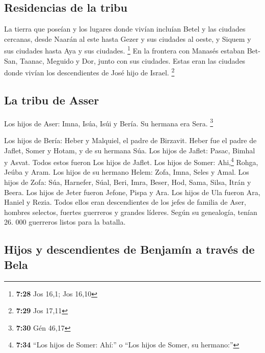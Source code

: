 \hypertarget{residencias-de-la-tribu}{%
\subsection{Residencias de la tribu}\label{residencias-de-la-tribu}}

 La tierra que poseían y los lugares donde vivían
incluían Betel y las ciudades cercanas, desde Naarán al este hasta Gezer
y sus ciudades al oeste, y Siquem y sus ciudades hasta Aya y sus
ciudades. \footnote{\textbf{7:28} Jos 16,1; Jos 16,10} 
En la frontera con Manasés estaban Bet-San, Taanac, Meguido y Dor, junto
con sus ciudades. Estas eran las ciudades donde vivían los descendientes
de José hijo de Israel. \footnote{\textbf{7:29} Jos 17,11}

\hypertarget{la-tribu-de-asser}{%
\subsection{La tribu de Asser}\label{la-tribu-de-asser}}

 Los hijos de Aser: Imna, Isúa, Isúi y Bería. Su hermana
era Sera. \footnote{\textbf{7:30} Gén 46,17}

 Los hijos de Bería: Heber y Malquiel, el padre de
Birzavit.  Heber fue el padre de Jaflet, Somer y Hotam, y
de su hermana Súa.  Los hijos de Jaflet: Pasac, Bimhal y
Asvat. Todos estos fueron Los hijos de Jaflet.  Los hijos
de Somer: Ahi,\footnote{\textbf{7:34} ``Los hijos de Somer: Ahí:'' o
  ``Los hijos de Somer, su hermano:''} Rohga, Jeúba y Aram.
 Los hijos de su hermano Helem: Zofa, Imna, Seles y Amal.
 Los hijos de Zofa: Súa, Harnefer, Súal, Beri, Imra,
 Beser, Hod, Sama, Silsa, Itrán y Beera. 
Los hijos de Jeter fueron Jefone, Pispa y Ara.  Los hijos
de Ula fueron Ara, Haniel y Rezia.  Todos ellos eran
descendientes de los jefes de familia de Aser, hombres selectos, fuertes
guerreros y grandes líderes. Según su genealogía, tenían 26. 000
guerreros listos para la batalla.

\hypertarget{hijos-y-descendientes-de-benjamuxedn-a-travuxe9s-de-bela}{%
\subsection{Hijos y descendientes de Benjamín a través de
Bela}\label{hijos-y-descendientes-de-benjamuxedn-a-travuxe9s-de-bela}}

